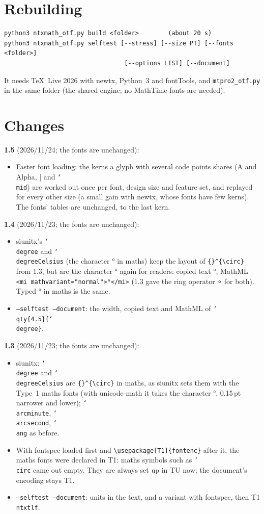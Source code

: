 \documentclass[11pt,a4paper]{article}
\newcommand\cs[1]{\texttt{\char`\\#1}}
\begin{document}
\section{Rebuilding}
\begin{verbatim}
python3 ntxmath_otf.py build <folder>        (about 20 s)
python3 ntxmath_otf.py selftest [--stress] [--size PT] [--fonts <folder>]
                                 [--options LIST] [--document]
\end{verbatim}
It needs \TeX\ Live 2026 with \textsf{newtx}, Python~3 and \textsf{fontTools}, and
\texttt{mtpro2\_otf.py} in the same folder (the shared engine; no MathTime fonts are
needed).

\section{Changes}
\textbf{1.5} (2026/11/24; the fonts are unchanged):
\begin{itemize}
\item Faster font loading: the kerns a glyph with several code points shares (A and Alpha,
  | and \cs{mid}) are worked out once per font, design size and feature set, and replayed for
  every other size (a small gain with newtx, whose fonts have few kerns). The fonts' tables are unchanged, to the last kern.
\end{itemize}
\textbf{1.4} (2026/11/23; the fonts are unchanged):
\begin{itemize}
\item \textsf{siunitx}'s \cs{degree} and \cs{degreeCelsius} (the character ° in maths) keep the
  layout of \verb|{}^{\circ}| from 1.3, but are the character ° again for readers: copied text
  °, MathML \verb|<mi mathvariant="normal">°</mi>| (1.3 gave the ring operator ∘ for both).
  Typed ° in maths is the same.
\item \texttt{--selftest --document}: the width, copied text and MathML of
  \cs{qty\{4.5\}\{\cs{degree}\}}.
\end{itemize}
\textbf{1.3} (2026/11/23; the fonts are unchanged):
\begin{itemize}
\item \textsf{siunitx}: \cs{degree} and \cs{degreeCelsius} are \verb|{}^{\circ}| in maths, as
  \textsf{siunitx} sets them with the Type~1 maths fonts (with \textsf{unicode-math} it takes the
  character °, 0.15\,pt narrower and lower); \cs{arcminute}, \cs{arcsecond}, \cs{ang} as before.
\item With \textsf{fontspec} loaded first and \verb|\usepackage[T1]{fontenc}| after it, the maths
  fonts were declared in T1: maths symbols such as \cs{circ} came out empty. They are always set
  up in TU now; the document's encoding stays T1.
\item \texttt{--selftest --document}: units in the text, and a variant with \textsf{fontspec},
  then T1 \texttt{ntxtlf}.
\end{itemize}
\end{document}
